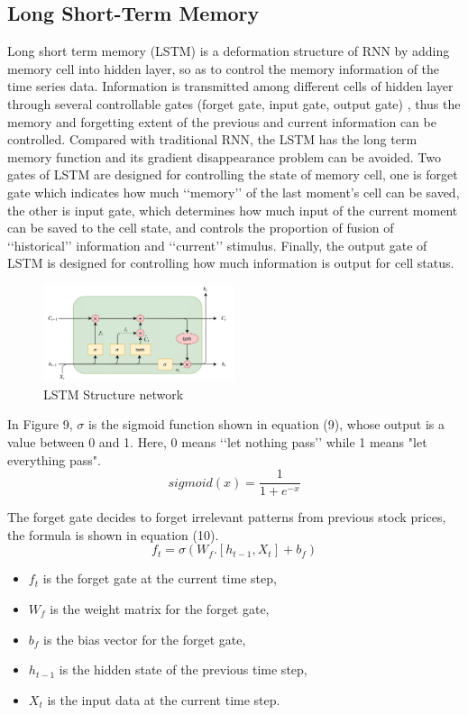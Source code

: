 \documentclass{ieeeojies}
\begin{document}
\subsection{Long Short-Term Memory}
Long short term memory (LSTM) \cite{b12} is a deformation structure of RNN by adding memory cell into hidden layer, so as to control the memory information of the time series data. Information is transmitted among different cells of hidden layer through several controllable gates (forget gate, input gate, output gate) \cite{b13}, thus the memory and forgetting extent of the previous and current information can be controlled. Compared with traditional RNN, the LSTM has the long term memory function and its gradient disappearance problem can be avoided. Two gates of LSTM are designed for controlling the state of memory cell, one is forget gate which indicates how much ‘‘memory’’ of the last moment’s cell can be saved, the other is input gate, which determines how much input of the current moment can be saved to the cell state, and controls the proportion of fusion of ‘‘historical’’ information and ‘‘current’’ stimulus. Finally, the output gate of LSTM is designed for controlling how much information is output for cell status.
\begin{figure} [H]
    \centering
    \includegraphics[width=0.5\textwidth]{bibliography/Figure/LSTM _structure.png}
    \caption{LSTM Structure network}
    \label{fig:LSTM structure}
\end{figure}

In Figure 9, $\sigma$ is the sigmoid function shown in equation (9), whose output is a value between 0 and 1. Here, 0 means ‘‘let nothing pass’’ while 1 means "let everything pass".
\begin{equation}
    sigmoid(x) = \frac{1}{1+e^{-x}}
\end{equation}

The forget gate decides to forget irrelevant patterns from previous stock prices, the formula is shown in equation (10).
\begin{equation}
    f_t = \sigma(W_f.[h_{t-1}, X_t] + b_f)
\end{equation}
\begin{itemize}
    \item $f_t$ is the forget gate at the current time step,
    \item $W_f$ is the weight matrix for the forget gate,
    \item $b_f$ is the bias vector for the forget gate,
    \item $h_{t-1}$ is the hidden state of the previous time step,
    \item $X_t$ is the input data at the current time step.
\end{itemize}
\end{document}
